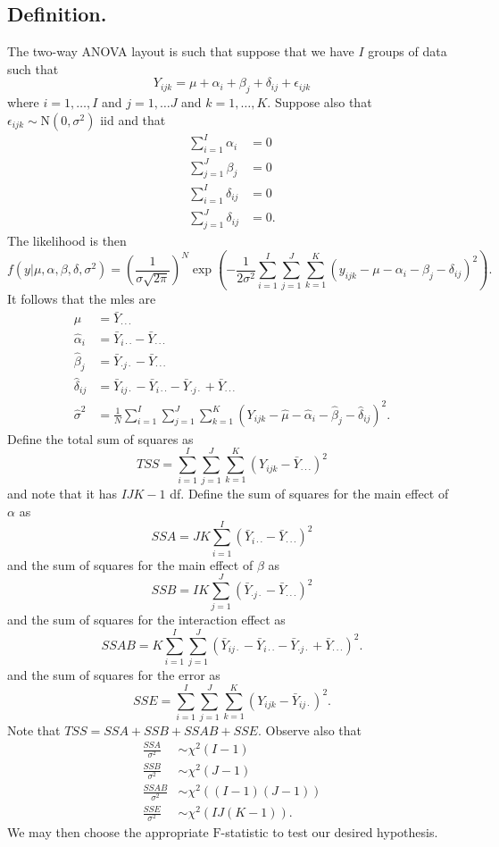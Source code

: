 \documentclass[titlepage]{article}
\begin{document}
\subsection{Definition.} The two-way ANOVA layout is such that suppose that we have $I$ groups of data such that 
$$Y_{ijk} = \mu + \alpha_{i} + \beta_{j} + \delta_{ij} + \epsilon_{ijk}$$
where $i = 1, \ldots, I$ and $j = 1, \ldots J$ and $k = 1, \ldots, K$. Suppose also that $\epsilon_{ijk} \sim \text{N}(0, \sigma^{2})$ iid and that 
\begin{align*}
     \sum_{i=1}^{I}\alpha_{i} &= 0 \\
      \sum_{j=1}^{J}\beta_{j} &= 0 \\
    \sum_{i=1}^{I}\delta_{ij} &= 0 \\
    \sum_{j=1}^{J}\delta_{ij} &= 0.
\end{align*}
The likelihood is then 
$$f(y|\mu, \alpha, \beta, \delta, \sigma^{2}) = \left(\frac{1}{\sigma\sqrt{2\pi}}\right)^{N}\exp\left(-\frac{1}{2\sigma^{2}}\sum_{i=1}^{I}\sum_{j=1}^{J}\sum_{k=1}^{K}(y_{ijk} - \mu - \alpha_{i} - \beta_{j} - \delta_{ij})^{2}\right).$$
It follows that the mles are 
\begin{align*}
            \hat{\mu} &= \bar{Y}_{\cdot\cdot\cdot} \\
     \hat{\alpha}_{i} &= \bar{Y}_{i\cdot\cdot} - \bar{Y}_{\cdot\cdot\cdot} \\
      \hat{\beta}_{j} &= \bar{Y}_{\cdot j\cdot} - \bar{Y}_{\cdot\cdot\cdot} \\
    \hat{\delta}_{ij} &= \bar{Y}_{ij\cdot} - \bar{Y}_{i\cdot\cdot} - \bar{Y}_{\cdot j\cdot} + \bar{Y}_{\cdot\cdot\cdot} \\
     \hat{\sigma}^{2} &= \frac{1}{N}\sum_{i=1}^{I}\sum_{j=1}^{J}\sum_{k=1}^{K}(Y_{ijk} - \hat{\mu} - \hat{\alpha}_{i} - \hat{\beta}_{j} - \hat{\delta}_{ij})^{2}.
\end{align*}
Define the total sum of squares as 
$$TSS = \sum_{i=1}^{I}\sum_{j=1}^{J}\sum_{k=1}^{K}(Y_{ijk} - \bar{Y}_{\cdot\cdot\cdot})^{2}$$
and note that it has $IJK-1$ df. Define the sum of squares for the main effect of $\alpha$ as
$$SSA = JK\sum_{i=1}^{I}(\bar{Y}_{i\cdot\cdot} - \bar{Y}_{\cdot\cdot\cdot})^{2}$$
and the sum of squares for the main effect of $\beta$ as
$$SSB = IK\sum_{j=1}^{J}(\bar{Y}_{\cdot j\cdot} - \bar{Y}_{\cdot\cdot\cdot})^{2}$$
and the sum of squares for the interaction effect as
$$SSAB = K\sum_{i=1}^{I}\sum_{j=1}^{J}(\bar{Y}_{ij\cdot} - \bar{Y}_{i\cdot\cdot} - \bar{Y}_{\cdot j\cdot} + \bar{Y}_{\cdot\cdot\cdot})^{2}.$$
and the sum of squares for the error as
$$SSE = \sum_{i=1}^{I}\sum_{j=1}^{J}\sum_{k=1}^{K}(Y_{ijk} - \bar{Y}_{ij\cdot})^{2}.$$
Note that $TSS = SSA + SSB + SSAB + SSE$. Observe also that 
\begin{align*}
     \frac{SSA}{\sigma^{2}} &\sim \chi^{2}(I-1) \\
     \frac{SSB}{\sigma^{2}} &\sim \chi^{2}(J-1) \\
    \frac{SSAB}{\sigma^{2}} &\sim \chi^{2}((I-1)(J-1)) \\
     \frac{SSE}{\sigma^{2}} &\sim \chi^{2}(IJ(K-1)).
\end{align*}
We may then choose the appropriate $\text{F}$-statistic to test our desired hypothesis.
\end{document}
